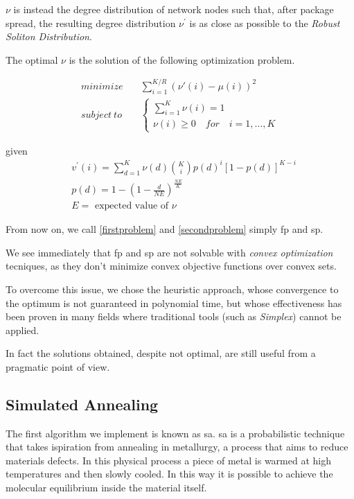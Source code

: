 \documentclass[journal]{IEEEtran}
\begin{document}
$\nu$ is instead the degree distribution of network nodes such that, after package spread, the resulting degree distribution $\nu^\prime$ is as close as possible to the \emph{Robust Soliton Distribution}.

The optimal $\nu$ is the solution of the following optimization problem\cite{Lin2007}.

\begin{equation}
	\label{secondproblem}
	\begin{split}
		minimize & \quad \sum_{i=1}^{K/R}(\nu'(i)-\mu(i))^2 \\
		subject \ to & \quad \begin{cases}
			\sum_{i=1}^K \nu(i) = 1 \\
			\nu(i) \geq 0 \quad for \quad i=1,...,K
		\end{cases}
	\end{split}
\end{equation}

given
\begin{equation*}
	\begin{split}
		& v^\prime(i) = \sum_{d=1}^K \nu(d) \binom{K}{i} p(d)^i [1-p(d)]^{K-i} \\
		& p(d) = 1 - \left(1 -\frac{d}{N E}\right)^{\frac{N E}{K}} \\
		& E = \text{ expected value of }\nu
	\end{split}
\end{equation*}

From now on, we call \eqref{firstproblem} and \eqref{secondproblem} simply \gls{fp} and \gls{sp}.

We see immediately that \gls{fp} and \gls{sp} are not solvable with \emph{convex optimization} tecniques, as they don't minimize convex objective functions over convex sets.

To overcome this issue, we chose the heuristic approach, whose convergence to the optimum is not guaranteed in polynomial time, but whose effectiveness has been proven in many fields \cite{Edelkamp2010} where traditional tools (such as \emph{Simplex}) cannot be applied.

In fact the solutions obtained, despite not optimal, are still useful from a pragmatic point of view.

\subsection{Simulated Annealing}

The first algorithm we implement is known as \gls{sa}.
\gls{sa} is a probabilistic technique that takes ispiration from annealing in metallurgy, a process that aims to reduce materials defects.
In this physical process a piece of metal is warmed at high temperatures and then slowly cooled. In this way it is possible to achieve the molecular equilibrium inside the material itself.
\end{document}
